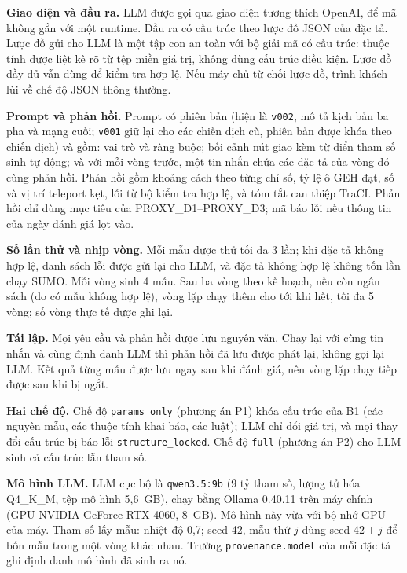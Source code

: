 \documentclass[../DoAn.tex]{subfiles}
\begin{document}
\textbf{Giao diện và đầu ra.} LLM được gọi qua giao diện tương thích OpenAI, để mã không gắn với một runtime. Đầu ra có cấu trúc theo lược đồ JSON của đặc tả. Lược đồ gửi cho LLM là một tập con an toàn với bộ giải mã có cấu trúc: thuộc tính được liệt kê rõ từ tệp miền giá trị, không dùng cấu trúc điều kiện. Lược đồ đầy đủ vẫn dùng để kiểm tra hợp lệ. Nếu máy chủ từ chối lược đồ, trình khách lùi về chế độ JSON thông thường.

\textbf{Prompt và phản hồi.} Prompt có phiên bản (hiện là \texttt{v002}, mô tả kịch bản ba pha và mạng cuối; \texttt{v001} giữ lại cho các chiến dịch cũ, phiên bản được khóa theo chiến dịch) và gồm: vai trò và ràng buộc; bối cảnh nút giao kèm từ điển tham số sinh tự động; và với mỗi vòng trước, một tin nhắn chứa các đặc tả của vòng đó cùng phản hồi. Phản hồi gồm khoảng cách theo từng chỉ số, tỷ lệ ô GEH đạt, số và vị trí teleport kẹt, lỗi từ bộ kiểm tra hợp lệ, và tóm tắt can thiệp TraCI. Phản hồi chỉ dùng mục tiêu của PROXY\_D1--PROXY\_D3; mã báo lỗi nếu thông tin của ngày đánh giá lọt vào.

\textbf{Số lần thử và nhịp vòng.} Mỗi mẫu được thử tối đa 3 lần; khi đặc tả không hợp lệ, danh sách lỗi được gửi lại cho LLM, và đặc tả không hợp lệ không tốn lần chạy SUMO. Mỗi vòng sinh 4 mẫu. Sau ba vòng theo kế hoạch, nếu còn ngân sách (do có mẫu không hợp lệ), vòng lặp chạy thêm cho tới khi hết, tối đa 5 vòng; số vòng thực tế được ghi lại.

\textbf{Tái lập.} Mọi yêu cầu và phản hồi được lưu nguyên văn. Chạy lại với cùng tin nhắn và cùng định danh LLM thì phản hồi đã lưu được phát lại, không gọi lại LLM. Kết quả từng mẫu được lưu ngay sau khi đánh giá, nên vòng lặp chạy tiếp được sau khi bị ngắt.

\textbf{Hai chế độ.} Chế độ \texttt{params\_only} (phương án P1) khóa cấu trúc của B1 (các nguyên mẫu, các thuộc tính khai báo, các luật); LLM chỉ đổi giá trị, và mọi thay đổi cấu trúc bị báo lỗi \texttt{structure\_locked}. Chế độ \texttt{full} (phương án P2) cho LLM sinh cả cấu trúc lẫn tham số.

\textbf{Mô hình LLM.} LLM cục bộ là \texttt{qwen3.5:9b} (9 tỷ tham số, lượng tử hóa Q4\_K\_M, tệp mô hình 5,6~GB), chạy bằng Ollama 0.40.11 trên máy chính (GPU NVIDIA GeForce RTX 4060, 8~GB). Mô hình này vừa với bộ nhớ GPU của máy. Tham số lấy mẫu: nhiệt độ 0,7; seed 42, mẫu thứ $j$ dùng seed $42 + j$ để bốn mẫu trong một vòng khác nhau. Trường \texttt{provenance.model} của mỗi đặc tả ghi định danh mô hình đã sinh ra nó.
\end{document}
